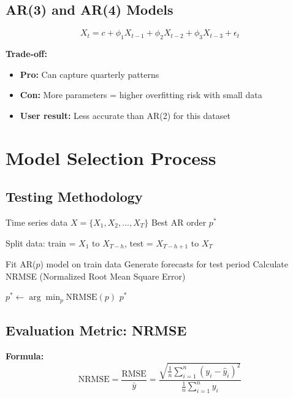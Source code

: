 \subsection{AR(3) and AR(4) Models}

$$X_t = c + \phi_1 X_{t-1} + \phi_2 X_{t-2} + \phi_3 X_{t-3} + \epsilon_t$$

\textbf{Trade-off:}
\begin{itemize}
    \item \textbf{Pro:} Can capture quarterly patterns
    \item \textbf{Con:} More parameters = higher overfitting risk with small data
    \item \textbf{User result:} Less accurate than AR(2) for this dataset
\end{itemize}

\section{Model Selection Process}

\subsection{Testing Methodology}

\begin{algorithm}[H]
\caption{AR Model Selection}
\begin{algorithmic}[1]
\Require Time series data $X = \{X_1, X_2, \ldots, X_T\}$
\Ensure Best AR order $p^*$

\State Split data: train = $X_1$ to $X_{T-h}$, test = $X_{T-h+1}$ to $X_T$

    \State Fit AR($p$) model on train data
    \State Generate forecasts for test period
    \State Calculate NRMSE (Normalized Root Mean Square Error)
\EndFor

\State $p^* \gets \arg\min_p \text{NRMSE}(p)$
\State \Return $p^*$
\end{algorithmic}
\end{algorithm}

\subsection{Evaluation Metric: NRMSE}

\textbf{Formula:}
$$\text{NRMSE} = \frac{\text{RMSE}}{\bar{y}} = \frac{\sqrt{\frac{1}{n}\sum_{i=1}^{n}(y_i - \hat{y}_i)^2}}{\frac{1}{n}\sum_{i=1}^{n}y_i}$$


